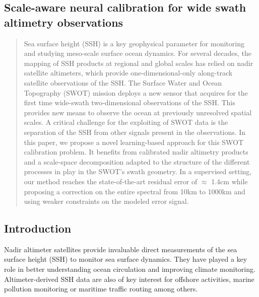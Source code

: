 \begin{bibunit}

\clearemptydoublepage
\chapter{Scale-aware neural calibration for wide swath altimetry observations}

\begin{abstract}
	Sea surface height (SSH) is a key geophysical parameter for monitoring and studying meso-scale surface ocean dynamics. For several decades, the mapping of SSH products at regional and global scales has relied on nadir satellite altimeters, which provide one-dimensional-only along-track satellite observations of the SSH.  
	The Surface Water and Ocean Topography (SWOT) mission  deploys a new sensor that acquires for the first time wide-swath two-dimensional observations of the SSH. This provides new means to observe the ocean at previously unresolved spatial scales. A critical challenge for the exploiting of SWOT data is the separation of the SSH from other signals present in the observations. In this paper, we propose a novel learning-based approach for this SWOT calibration problem. It benefits from calibrated nadir altimetry products and a scale-space decomposition adapted to the structure of the different processes in play in the SWOT's swath geometry.
	In a supervised setting, our method reaches the state-of-the-art residual error of $\approx$ 1.4cm while proposing a correction on the entire spectral from 10km to 1000km and using weaker constraints on the modeled error signal.
\end{abstract}




\section{Introduction}

Nadir altimeter satellites provide invaluable direct measurements of the sea surface height (SSH) to monitor sea surface dynamics. 
They have played a key role in better understanding ocean circulation and improving climate monitoring. Altimeter-derived SSH data are also of key interest for offshore activities, marine pollution monitoring or maritime traffic routing among others. 


\end{bibunit}

